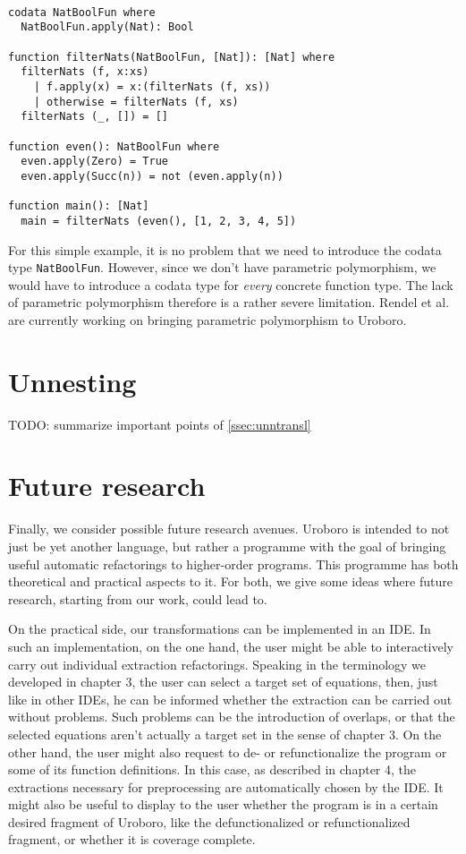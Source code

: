\begin{lstlisting}

codata NatBoolFun where
  NatBoolFun.apply(Nat): Bool

function filterNats(NatBoolFun, [Nat]): [Nat] where
  filterNats (f, x:xs)
    | f.apply(x) = x:(filterNats (f, xs))
    | otherwise = filterNats (f, xs)
  filterNats (_, []) = []

function even(): NatBoolFun where
  even.apply(Zero) = True
  even.apply(Succ(n)) = not (even.apply(n))

function main(): [Nat]
  main = filterNats (even(), [1, 2, 3, 4, 5])

\end{lstlisting}

For this simple example, it is no problem that we need to introduce the codata type \texttt{NatBoolFun}. However, since we don't have parametric polymorphism, we would have to introduce a codata type for \textit{every} concrete function type. The lack of parametric polymorphism therefore is a rather severe limitation. Rendel et al. are currently working on bringing parametric polymorphism to Uroboro.

\section{Unnesting}
\label{sec:relunn}

TODO: summarize important points of \autoref{ssec:unntransl}

\section{Future research}
\label{sec:futr}

Finally, we consider possible future research avenues. Uroboro is intended to not just be yet another language, but rather a programme with the goal of bringing useful automatic refactorings to higher-order programs. This programme has both theoretical and practical aspects to it. For both, we give some ideas where future research, starting from our work, could lead to.

On the practical side, our transformations can be implemented in an IDE. In such an implementation, on the one hand, the user might be able to interactively carry out individual extraction refactorings. Speaking in the terminology we developed in chapter 3, the user can select a target set of equations, then, just like in other IDEs, he can be informed whether the extraction can be carried out without problems. Such problems can be the introduction of overlaps, or that the selected equations aren't actually a target set in the sense of chapter 3. On the other hand, the user might also request to de- or refunctionalize the program or some of its function definitions. In this case, as described in chapter 4, the extractions necessary for preprocessing are automatically chosen by the IDE. It might also be useful to display to the user whether the program is in a certain desired fragment of Uroboro, like the defunctionalized or refunctionalized fragment, or whether it is coverage complete.

